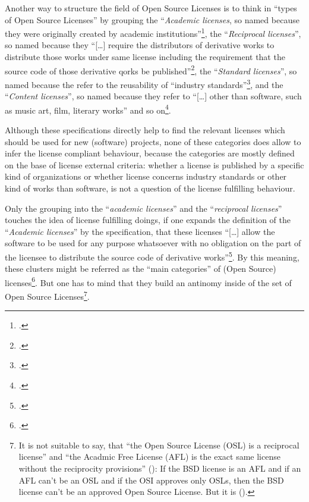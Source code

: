 Another way to structure the field of Open Source Licenses is to think in
\enquote{types of Open Source Licenses} by grouping the \enquote{\emph{Academic
licenses}, so named because they were originally created by academic
institutions}\footcite[cf.][69]{Rosen2005a}, the \enquote{\emph{Reciprocal
licenses}}, so named because they \enquote{[\ldots] require the distributors of
derivative works to distribute those works under same license including the
requirement that the source code of those derivative qorks be
published}\footcite[cf.][70]{Rosen2005a}, the \enquote{\emph{Standard
licenses}}, so named because the refer to the reusability of \enquote{industry
standards}\footcite[cf.][70]{Rosen2005a}, and the \enquote{\emph{Content
licenses}}, so named because they refer to
\enquote{[\ldots] other than software, such as music art, film, literary works}
and so on\footcite[cf.][71]{Rosen2005a}.

Although these specifications directly help to find the relevant licenses which
should be used for new (software) projects, none of these categories does allow
to infer the license compliant behaviour, because the categories are mostly
defined on the base of license external criteria: whether a license is published
by a specific kind of organizations or whether license concerns industry
standards or other kind of works than software, is not a question of the license
fulfilling behaviour.

Only the grouping into the \enquote{\emph{academic licenses}} and the
\enquote{\emph{reciprocal licenses}} touches the idea of license fulfilling
doings, if one expands the definition of the \enquote{\emph{Academic licenses}}
by the specification, that these licenses \enquote{[\ldots] allow the software
to be used for any purpose whatsoever with no obligation on the part of the
licensee to distribute the source code of derivative
works}\footcite[cf.][71]{Rosen2005a}. By this meaning, these clusters might be
referred as the \enquote{main categories} of (Open Source)
licenses\footcite[cf.][179]{Rosen2005a}. But one has to mind that they build an
antinomy inside of the set of Open Source Licenses\footnote{It is not suitable
to say, that \enquote{the Open Source License (OSL) is a reciprocal license} and
 \enquote{the Acadmic Free License (AFL) is the exact same license without the
 reciprocity provisions} (\cite[cf.][180]{Rosen2005a}): If the BSD license is an
 AFL and if an AFL can't be an OSL and if the OSI approves only OSLs, then the
 BSD license can't be an approved Open Source License. But it is
 (\cite[cf.][\nopage wp]{OSI2012b}).}.

